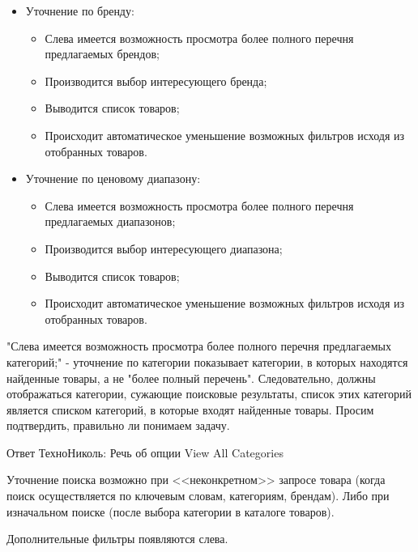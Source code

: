 {\begin{wikilong}
\begin{itemize}
\item Уточнение по бренду:

	\begin{itemize}
		\item Слева имеется возможность просмотра более полного перечня предлагаемых брендов;
		\item Производится выбор интересующего бренда;
		\item Выводится список товаров;
		\item Происходит автоматическое уменьшение возможных фильтров исходя из отобранных товаров.
	\end{itemize}

\item Уточнение по ценовому диапазону:

	\begin{itemize}
		\item Слева имеется возможность просмотра более полного перечня предлагаемых диапазонов;
		\item Производится выбор интересующего диапазона;
		\item Выводится список товаров;
		\item Происходит автоматическое уменьшение возможных фильтров исходя из отобранных товаров.
	\end{itemize}

\end{itemize}
\end{wikilong}

\begin{teamidea}
"Слева имеется возможность просмотра более полного перечня предлагаемых категорий;" - уточнение по категории показывает категории, в которых находятся найденные товары, а не "более полный перечень". Следовательно, должны отображаться категории, сужающие поисковые результаты, список этих категорий является списком категорий, в которые входят найденные товары. Просим подтвердить, правильно ли понимаем задачу.

Ответ ТехноНиколь: Речь об опции View All Categories
\end{teamidea}



\begin{itogolong}
Уточнение поиска возможно при <<неконкретном>> запросе товара (когда поиск осуществляется по ключевым словам, категориям, брендам). Либо при изначальном поиске (после выбора категории в каталоге товаров).

Дополнительные фильтры появляются слева.


\end{itogolong}}
